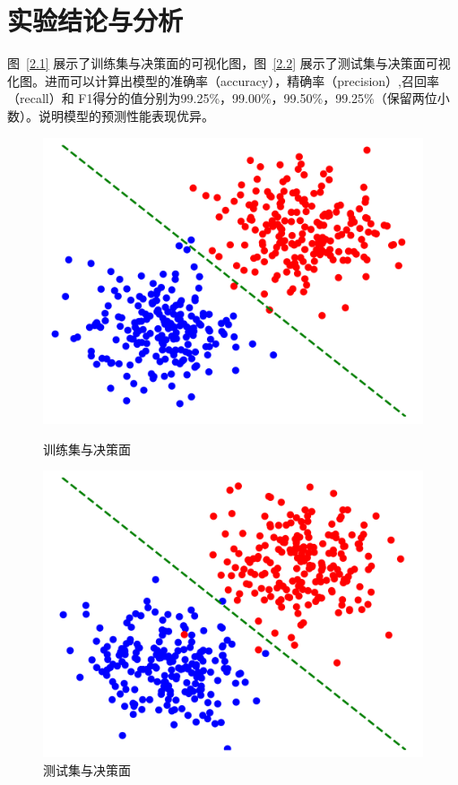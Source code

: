 \documentclass[a4paper,12pt]{report}
\begin{document}
\section{实验结论与分析}
\par 图~\ref{2.1} 展示了训练集与决策面的可视化图，图~\ref{2.2} 展示了测试集与决策面可视化图。进而可以计算出模型的准确率（accuracy），精确率（precision）,召回率（recall）和 F1得分的值分别为99.25\%，99.00\%，99.50\%，99.25\%（保留两位小数）。说明模型的预测性能表现优异。
\begin{figure}[htbp]
    \centering
    \begin{minipage}{0.42\textwidth}
        \centering
        \includegraphics[width=\textwidth]{../datasets/exp2/output/train.png}
        \caption{训练集与决策面}
        \label{2.1}
    \end{minipage}
    \hfill
    \begin{minipage}{0.42\textwidth}
        \centering
        \includegraphics[width=\textwidth]{../datasets/exp2/output/test.png}
        \caption{测试集与决策面}
        \label{2.2}
    \end{minipage}
    \label{fig:train_test_comparison}
\end{figure}
\end{document}

